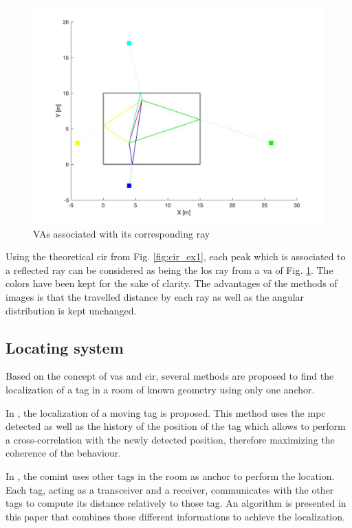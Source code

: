 \begin{figure}[H]
	\centering
	\includegraphics[width=.6\linewidth]{Images/va_map.jpg}
	\caption{VAs associated with its corresponding ray}
	\label{fig:va_room}
\end{figure}
 
Using the theoretical \gls{cir} from Fig. \ref{fig:cir_ex1}, each peak which is associated to a reflected ray can be considered as being the \gls{los} ray from a \gls{va} of Fig. \ref{fig:va_room}. The colors have been kept for the sake of clarity. The advantages of the methods of images is that the travelled distance by each ray as well as the angular distribution is kept unchanged.


\subsection{Locating system}
\label{loc_syst_mpc}

Based on the concept of \glspl{va} and \gls{cir}, several methods are proposed to find the localization of a tag in a room of known geometry using only one anchor.
\vspace{2mm}

In \cite{meissner2010mc}, the localization of a moving tag is proposed. This method uses the \gls{mpc} detected as well as the history of the position of the tag which allows to perform a cross-correlation with the newly detected position, therefore maximizing the coherence of the behaviour.
\vspace{2mm}

In \cite{froehle2013cooperative}, the \gls{comint} uses other tags in the room as anchor to perform the location. Each tag, acting as a transceiver and a receiver, communicates with the other tags to compute its distance relatively to those tag. An algorithm is presented in this paper that combines those different informations to achieve the localization.
\vspace{2mm}


